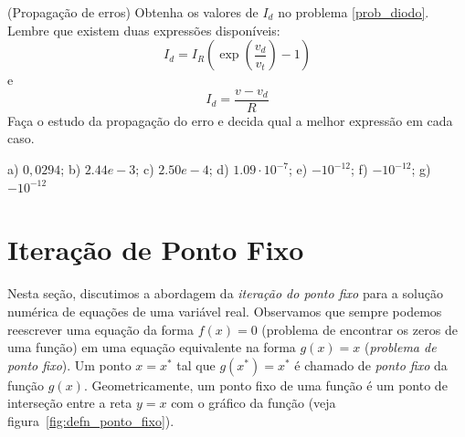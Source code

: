 \begin{exer}(Propagação de erros) Obtenha os valores de $I_d$ no problema \ref{prob_diodo}. Lembre que existem duas expressões disponíveis:
  \begin{equation*}
    I_d=I_R\left(\exp\left(\frac{v_d}{v_t}\right)-1\right)  
  \end{equation*}
e
\begin{equation*}
  I_d=\frac{v-v_d}{R}
\end{equation*}
Faça o estudo da propagação do erro e decida qual a melhor expressão em cada caso.
\end{exer}
\begin{resp}
  
  a) $0,0294$; b) $2.44e-3$; c) $2.50e-4$; d) $1.09\cdot 10^{-7}$; e) $- 10^{-12}$; f) $-10^{-12}$; g) $- 10^{-12}$  
  
\end{resp}

\section{Iteração de Ponto Fixo}

Nesta seção, discutimos a abordagem da \emph{iteração do ponto fixo} para a solução numérica de equações de uma variável real. Observamos que sempre podemos reescrever uma equação da forma $f(x) = 0$ (problema de encontrar os zeros de uma função) em uma equação equivalente na forma $g(x) = x$ (\emph{problema de ponto fixo}). Um ponto $x = x^*$ tal que $g(x^*) = x^*$ é chamado de \emph{ponto fixo} da função $g(x)$. Geometricamente, um ponto fixo de uma função é um ponto de interseção entre a reta $y = x$ com o gráfico da função (veja figura~\ref{fig:defn_ponto_fixo}).

